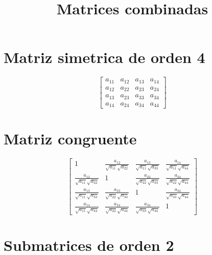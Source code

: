 \documentclass[12pt]{article}
\begin{document}
\title{Matrices combinadas}
\maketitle

\section*{Matriz simetrica de orden 4}

$$\left[\begin{matrix}a_{11} & a_{12} & a_{13} & a_{14}\\a_{12} & a_{22} & a_{23} & a_{24}\\a_{13} & a_{23} & a_{33} & a_{34}\\a_{14} & a_{24} & a_{34} & a_{44}\end{matrix}\right]$$


\section*{Matriz congruente}

$$\left[\begin{matrix}1 & \frac{a_{12}}{\sqrt{a_{11}} \sqrt{a_{22}}} & \frac{a_{13}}{\sqrt{a_{11}} \sqrt{a_{33}}} & \frac{a_{14}}{\sqrt{a_{11}} \sqrt{a_{44}}}\\\frac{a_{12}}{\sqrt{a_{11}} \sqrt{a_{22}}} & 1 & \frac{a_{23}}{\sqrt{a_{22}} \sqrt{a_{33}}} & \frac{a_{24}}{\sqrt{a_{22}} \sqrt{a_{44}}}\\\frac{a_{13}}{\sqrt{a_{11}} \sqrt{a_{33}}} & \frac{a_{23}}{\sqrt{a_{22}} \sqrt{a_{33}}} & 1 & \frac{a_{34}}{\sqrt{a_{33}} \sqrt{a_{44}}}\\\frac{a_{14}}{\sqrt{a_{11}} \sqrt{a_{44}}} & \frac{a_{24}}{\sqrt{a_{22}} \sqrt{a_{44}}} & \frac{a_{34}}{\sqrt{a_{33}} \sqrt{a_{44}}} & 1\end{matrix}\right]$$

\section*{Submatrices de orden 2}
\end{document}
